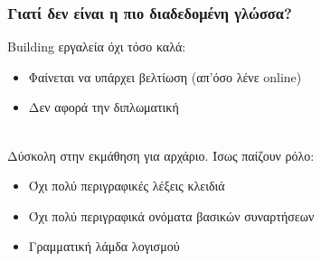 \documentclass{beamer}
\def\e{\foreignlanguage{english}}
\begin{document}
\begin{frame}

\frametitle{Γιατί δεν είναι η πιο διαδεδομένη γλώσσα?}

\e{Building} εργαλεία όχι τόσο καλά:

\begin{itemize}

\item Φαίνεται να υπάρχει βελτίωση (απ'όσο λένε \e{online})

\item Δεν αφορά την διπλωματική
\\~\

\end{itemize}


Δύσκολη στην εκμάθηση για αρχάριο. Ίσως παίζουν ρόλο:

\begin{itemize}

\item Όχι πολύ περιγραφικές λέξεις κλειδιά

\item Όχι πολύ περιγραφικά ονόματα βασικών συναρτήσεων

\item Γραμματική λάμδα λογισμού

\end{itemize}

\end{frame}
\end{document}
